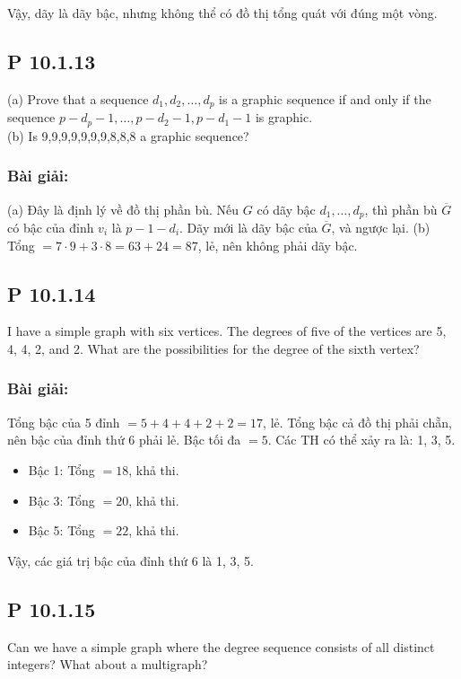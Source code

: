 \documentclass[a4paper,12pt]{article}
\begin{document}
Vậy, dãy là dãy bậc, nhưng không thể có đồ thị tổng quát với đúng một vòng.

\subsection*{P 10.1.13}
(a) Prove that a sequence $d_1, d_2, \ldots, d_p$ is a graphic sequence if and only if the sequence $p - d_p - 1, \ldots, p - d_2 - 1, p - d_1 - 1$ is graphic. \\
(b) Is 9,9,9,9,9,9,9,8,8,8 a graphic sequence?

\subsubsection*{Bài giải:}
(a) Đây là định lý về đồ thị phần bù. Nếu \( G \) có dãy bậc \( d_1, \ldots, d_p \), thì phần bù \( \overline{G} \) có bậc của đỉnh \( v_i \) là \( p-1-d_i \). Dãy mới là dãy bậc của \( \overline{G} \), và ngược lại.  
(b) Tổng \( = 7 \cdot 9 + 3 \cdot 8 = 63 + 24 = 87 \), lẻ, nên không phải dãy bậc.

\subsection*{P 10.1.14}
I have a simple graph with six vertices. The degrees of five of the vertices are 5, 4, 4, 2, and 2. What are the possibilities for the degree of the sixth vertex?

\subsubsection*{Bài giải:}
Tổng bậc của 5 đỉnh \( = 5 + 4 + 4 + 2 + 2 = 17 \), lẻ. Tổng bậc cả đồ thị phải chẵn, nên bậc của đỉnh thứ 6 phải lẻ. Bậc tối đa \( = 5 \). Các TH có thể xảy ra là: 1, 3, 5.
\begin{itemize}
    \item Bậc 1: Tổng \( = 18 \), khả thi.
    \item Bậc 3: Tổng \( = 20 \), khả thi.
    \item Bậc 5: Tổng \( = 22 \), khả thi.
\end{itemize}

Vậy, các giá trị bậc của đỉnh thứ 6 là 1, 3, 5.

\subsection*{P 10.1.15}
Can we have a simple graph where the degree sequence consists of all distinct integers? What about a multigraph?
\end{document}
